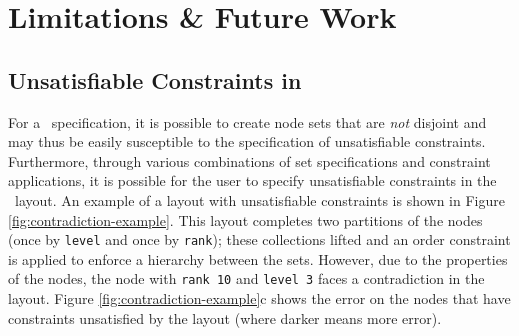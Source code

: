 \section{Limitations \& Future Work}
\constraintsFigure






\subsection{Unsatisfiable Constraints in \projectname}
For a \projectname\ specification, it is possible to create node sets that
are \emph{not} disjoint and may thus be easily susceptible to the
specification of unsatisfiable constraints. Furthermore, through various
combinations of set specifications and constraint applications, it is
possible for the user to specify unsatisfiable constraints in the
\projectname\ layout. An example of a layout with unsatisfiable constraints
is shown in Figure \ref{fig:contradiction-example}. This layout completes
two partitions of the nodes (once by \texttt{level} and once by
\texttt{rank}); these collections lifted and an order constraint is applied
to enforce a hierarchy between the sets. However, due to the properties of
the nodes, the node with \texttt{rank 10} and \texttt{level 3} faces a
contradiction in the layout. Figure \ref{fig:contradiction-example}c shows
the error on the nodes that have constraints unsatisfied by the layout
(where darker means more error).

